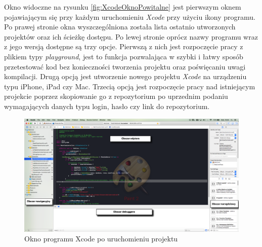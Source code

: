 \documentclass{iiuwb}
\begin{document}
Okno widoczne na rysunku \ref{fig:XcodeOknoPowitalne} jest pierwszym oknem pojawiającym się przy każdym uruchomieniu  \textit{Xcode} przy użyciu ikony programu. Po prawej stronie okna wyszczególniona została lista ostatnio utworzonych projektów oraz ich ścieżkę dostępu. Po lewej stronie oprócz nazwy programu wraz z jego wersją dostępne są trzy opcje. Pierwszą z nich jest rozpoczęcie pracy z plikiem typy \textit{playground}, jest to funkcja pozwalająca w szybki i łatwy sposób przetestować kod bez konieczności tworzenia projektu oraz poświęcaniu uwagi kompilacji. Drugą opcją jest utworzenie nowego projektu \textit{Xcode} na urządzeniu typu iPhone, iPad czy Mac. Trzecią opcją jest rozpoczęcie pracy nad istniejącym projekcie poprzez skopiowanie go z repozytorium po uprzednim podaniu wymagających danych typu login, hasło czy link do repozytorium.

\begin{figure}[!th]
\centering
\includegraphics[scale=.3]{image/XcodeOknoProgramu.png}
\caption{Okno programu Xcode po uruchomieniu projektu}
\label{fig:XcodeOknoProgramu}
\end{figure}
\end{document}
